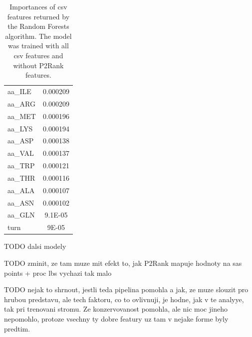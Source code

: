 \begin{table}[]
{\begin{tabular}{@{}lc@{}}
aa\_ILE              & 0.000209            \\
aa\_ARG              & 0.000209            \\
aa\_MET              & 0.000196            \\
aa\_LYS              & 0.000194            \\
aa\_ASP              & 0.000138            \\
aa\_VAL              & 0.000137            \\
aa\_TRP              & 0.000121            \\
aa\_THR              & 0.000116            \\
aa\_ALA              & 0.000107            \\
aa\_ASN              & 0.000102            \\
aa\_GLN              & 9.1E-05             \\
turn                 & 9E-05               \\ \bottomrule
\end{tabular}
}
\caption[Importances of csv features returned by the Random Forests algorithm]{Importances of csv features returned by the Random Forests algorithm. The model was trained with all csv features and without P2Rank features.}
\label{tab:importances}
\end{table}






TODO dalsi modely 

TODO zminit, ze tam muze mit efekt to, jak P2Rank mapuje hodnoty na sas points + proc lbs vychazi tak malo

TODO nejak to shrnout, jestli teda pipelina pomohla a jak, ze muze slouzit pro hrubou predstavu, ale tech faktoru, co to ovlivnuji, je hodne, jak v te analyye, tak pri trenovani stromu. Ze konzervovanost pomohla, ale nic moc jineho nepomohlo, protoze vsechny ty dobre featury uz tam v nejake forme byly predtim.


